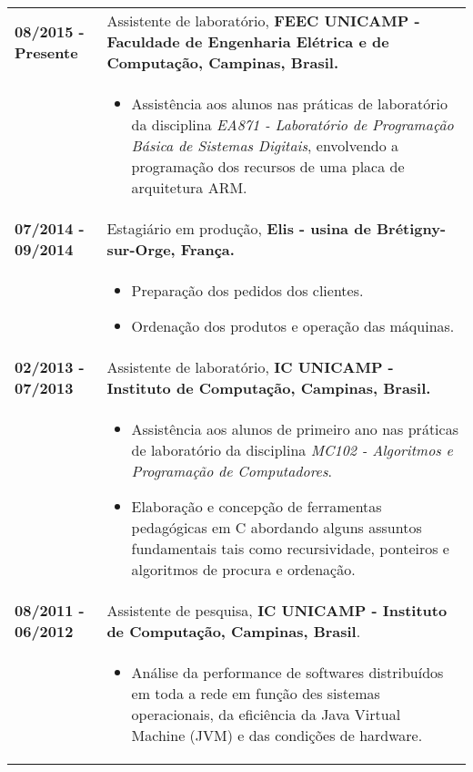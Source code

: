 \documentclass[10pt, a4paper]{article}
\begin{document}
\begin{tabular}{p{} p{}}

\textbf{08/2015 - Presente}  & Assistente de laboratório, \textbf{FEEC
 UNICAMP - Faculdade de Engenharia Elétrica e de Computação, Campinas, Brasil.}
 \\
  & \vspace{-12pt}
  \begin{itemize}
    \item Assistência aos alunos nas práticas de laboratório da
    disciplina \textit{EA871 - Laboratório de Programação Básica de Sistemas
    Digitais}, envolvendo a programação dos recursos de uma placa de arquitetura
    ARM.
    
	\end{itemize}\\

 \textbf{07/2014 - 09/2014}   & Estagiário em  produção,
 \textbf{Elis -  usina de Brétigny-sur-Orge, França.}\\
  & \vspace{-12pt}
  \begin{itemize}
    \item Preparação dos pedidos dos clientes. \vspace{-8pt}
    \item Ordenação dos produtos e operação das máquinas.
  \end{itemize} \\

 \textbf{02/2013 - 07/2013}   & Assistente de laboratório, \textbf{IC
 UNICAMP - Instituto de Computação, Campinas, Brasil.} \\
  & \vspace{-12pt}
  \begin{itemize}
    \item Assistência aos alunos de primeiro ano nas práticas de laboratório da
    disciplina \textit{MC102 - Algoritmos e Programação de Computadores}.
    \vspace{-8pt}
    \item Elaboração e concepção de ferramentas pedagógicas em C
    abordando alguns assuntos fundamentais tais como recursividade, ponteiros e
    algoritmos de procura e ordenação.
	\end{itemize}\\

 \textbf{08/2011 - 06/2012} & Assistente de pesquisa, \textbf{IC UNICAMP -
 Instituto de Computação, Campinas, Brasil}. \\
 & \vspace{-12pt}
 \begin{itemize}
 	\item Análise da performance de softwares distribuídos em toda a rede em
 	função des sistemas operacionais, da eficiência da Java Virtual Machine (JVM)
 	e das condições de hardware.
 	\end{itemize}
 \\
 

\end{tabular}
\end{document}
